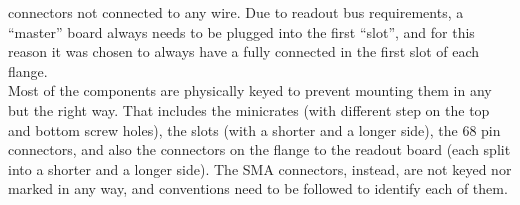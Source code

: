 connectors not connected to any wire.
Due to readout bus requirements, a ``master'' board always needs to be plugged
into the first ``slot'', and for this reason it was chosen to always have a
fully connected \DBB in the first slot of each flange.
\\
Most of the components are physically keyed to prevent mounting them in any but
the right way.
That includes the minicrates (with different step on the top and bottom screw
holes), the slots (with a shorter and a longer side), the 68 pin connectors,
and also the connectors on the flange to the readout board (each split into a
shorter and a longer side).
The SMA connectors, instead, are not keyed nor marked in any way, and
conventions need to be followed to identify each of them.

